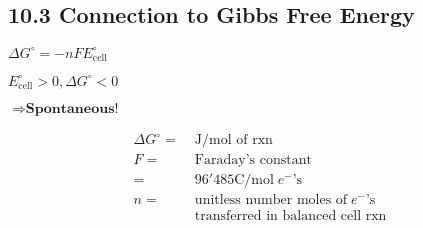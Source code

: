 \subsection{10.3 Connection to Gibbs Free Energy}
\vspace*{-0.5em}
    \begin{minipage}{0.99\linewidth}
        \begin{minipage}{0.32\linewidth}
            \centerline{$\Delta G^\circ = -n F E^\circ_\text{cell}$}
            \vspace*{2em}
            \centerline{$E^\circ_\text{cell} > 0, \Delta G^\circ < 0$}
            \vspace*{0.5em}
            \centerline{$\Rightarrow \textbf{Spontaneous!}$}
        \end{minipage}
        \begin{minipage}{0.61\linewidth}
            \begin{align*}
                \Delta G^\circ =& \; \textrm{J/mol of rxn}\\
                F =& \; \textrm{Faraday's constant}\\
                =& \; 96'485 \textrm{C/mol} \; e^- \textrm{'s}\\
                n =& \; \textrm{unitless number moles of} \; e^- \textrm{'s}\\
                & \; \textrm{transferred in balanced cell rxn}\\
            \end{align*}
        \end{minipage}
    \end{minipage}